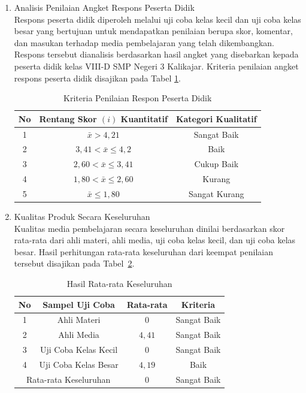 \documentclass[12pt]{article}
\begin{document}
\begin{enumerate}
    \item Analisis Penilaian Angket Respons Peserta Didik\\
    \hspace*{1cm}Respons peserta didik diperoleh melalui uji coba kelas kecil dan uji coba kelas besar yang bertujuan untuk mendapatkan penilaian berupa skor, komentar, dan masukan terhadap media pembelajaran yang telah dikembangkan. Respons tersebut dianalisis berdasarkan hasil angket yang disebarkan kepada peserta didik kelas VIII-D SMP Negeri 3 Kalikajar. Kriteria penilaian angket respons peserta didik disajikan pada Tabel \ref{kriteriaresponsiswa}.
    \begin{table}[H]
        \centering
        \caption{Kriteria Penilaian Respon Peserta Didik}
        \label{kriteriaresponsiswa}
        \begin{tabular}{|c|c|c|}
            \hline
            \textbf{No} & \textbf{Rentang Skor \( (i) \) Kuantitatif} & \textbf{Kategori Kualitatif}\\
            \hline
            1 & \( \bar{x} > 4{,}21 \) & Sangat Baik\\
            2 & \( 3{,}41 < \bar{x} \leq 4{,}2 \) & Baik\\
            3 & \( 2{,}60 < \bar{x} \leq 3{,}41 \) & Cukup Baik\\
            4 & \( 1{,}80 < \bar{x} \leq 2{,}60 \) & Kurang\\
            5 & \( \bar{x} \leq 1{,80} \) & Sangat Kurang\\
            \hline 
        \end{tabular}
    \end{table}
    \item Kualitas Produk Secara Keseluruhan\\
    \hspace*{1cm}Kualitas media pembelajaran secara keseluruhan dinilai berdasarkan skor rata-rata dari ahli materi, ahli media, uji coba kelas kecil, dan uji coba kelas besar. Hasil perhitungan rata-rata keseluruhan dari keempat penilaian tersebut disajikan pada Tabel~\ref{ratakeseluruhan}.\\
    \begin{table}[H]
        \centering
        \caption{Hasil Rata-rata Keseluruhan}
        \label{ratakeseluruhan}
        \begin{tabular}{|c|c|c|c|}
            \hline
            \textbf{No} & \textbf{Sampel Uji Coba} & \textbf{Rata-rata} & \textbf{Kriteria}\\
            \hline
            1 & Ahli Materi & 0 & Sangat Baik\\
            2 & Ahli Media & \( 4{,}41 \) & Sangat Baik\\
            3 & Uji Coba Kelas Kecil & 0 & Sangat Baik\\
            4 & Uji Coba Kelas Besar & \( 4{,}19 \) & Baik\\
            \hline
            \multicolumn{2}{|c|}{Rata-rata Keseluruhan} & 0 & Sangat Baik\\
            \hline
            

\end{tabular}
\end{table}
\end{enumerate}
\end{document}
